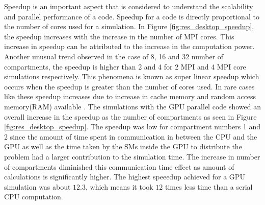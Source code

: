 \documentclass[preprint,10pt,authoryear,review]{elsarticle}
\begin{document}
Speedup is an important aspect that is considered to understand the scalability and 
parallel performance of a code. Speedup for a code is directly proportional 
to the number of cores used for a simulation. 
In Figure \ref{fig:res_desktop_speedup}, the speedup increases with the increase in 
the number of MPI cores. This increase in speedup can be attributed to the increase 
in the computation power. Another unusual trend observed in the case of 8, 16 and 
32 number of compartments, the speedup is higher than 2 and 4 for 2 MPI and 4 MPI core simulations respectively. This phenomena is known as super linear speedup which occurs 
when the speedup is greater than the number of cores used. In rare cases like these
speedup increases due to increase in cache memory and random access memory(RAM) 
available \citep{tuncer2009}. The simulations with the GPU parallel code showed an 
overall increase in the speedup as the number of compartments as seen in Figure 
\ref{fig:res_desktop_speedup}. The speedup was low for compartment numbers 1 and 2 
since the amount of time spent in communication in between the CPU and the GPU as well 
as the time taken by the SMs inside the GPU to distribute the problem had a larger 
contribution to the simulation time. The increase in number of compartments diminished 
this communication time effect as amount of calculations is significantly higher. The 
highest speeedup achieved for a GPU simulation was about $12.3$, which means it took 
$12$ times less time than a serial CPU computation. 
\end{document}
